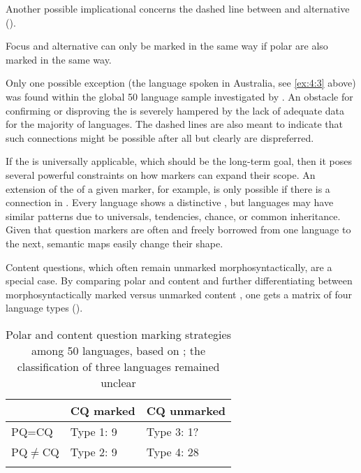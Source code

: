 Another possible implicational  concerns the dashed line between  and alternative  (\citealt{Hölzl2015b}).

\ea\upshape%
    \label{ex:4:28}
      Focus and alternative  can only be marked in the same way if polar  are also marked in the same way.\\
    \z

\noindent Only one possible exception (the  language  spoken in Australia, see \ref{ex:4:3} above) was found within the global 50 language sample investigated by \cite{Hölzl2015b}. An obstacle for confirming or disproving the  is severely hampered by the lack of adequate data for the majority of languages. The dashed lines are also meant to indicate that such connections might be possible after all but clearly are dispreferred.

If the  is universally applicable, which should be the long-term goal, then it poses several powerful constraints on how markers can expand their scope. An extension of the  of a given marker, for example, is only possible if there is a connection in . Every language shows a distinctive , but languages may have similar patterns due to universals, tendencies, chance,  or common inheritance. Given that question markers are often and freely borrowed from one language to the next, semantic maps easily change their shape.

Content questions, which often remain unmarked morphosyntactically, are a special case. By comparing polar and content  and further differentiating between morphosyntactically marked versus unmarked content , one gets a matrix of four language types ().

\begin{table}
\caption{Polar and content question marking strategies among 50 languages, based on \cite{Hölzl2015b}; the classification of three languages remained unclear}
\label{tab:4:6}

\begin{tabularx}{\textwidth}{XXl}
\lsptoprule
& CQ marked & CQ unmarked\\
\midrule
PQ=CQ & Type 1: 9 & Type 3: 1?\\
PQ${\neq}$CQ & Type 2: 9 & Type 4: 28\\
\lspbottomrule
\end{tabularx}
\end{table}

